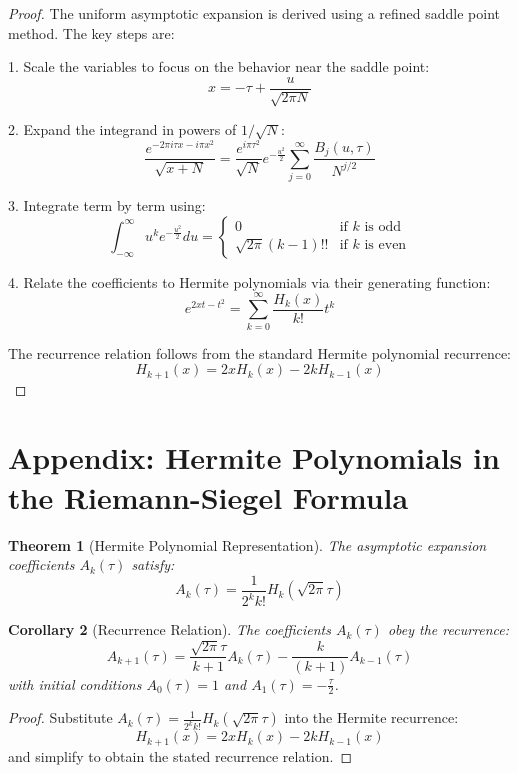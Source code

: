 \documentclass{article}
\newtheorem{theorem}{Theorem}
\newtheorem{corollary}[theorem]{Corollary}
\begin{document}
\begin{proof}
The uniform asymptotic expansion is derived using a refined saddle point method. The key steps are:

1. Scale the variables to focus on the behavior near the saddle point:
\[
x = -\tau + \frac{u}{\sqrt{2\pi N}}
\]

2. Expand the integrand in powers of $1/\sqrt{N}$:
\[
\frac{e^{-2\pi i\tau x - i\pi x^2}}{\sqrt{x+N}} = \frac{e^{i\pi\tau^2}}{\sqrt{N}} e^{-\frac{u^2}{2}} \sum_{j=0}^{\infty} \frac{B_j(u,\tau)}{N^{j/2}}
\]

3. Integrate term by term using:
\[
\int_{-\infty}^{\infty} u^k e^{-\frac{u^2}{2}} du = 
\begin{cases}
0 & \text{if } k \text{ is odd} \\
\sqrt{2\pi} (k-1)!! & \text{if } k \text{ is even}
\end{cases}
\]

4. Relate the coefficients to Hermite polynomials via their generating function:
\[
e^{2xt-t^2} = \sum_{k=0}^{\infty} \frac{H_k(x)}{k!} t^k
\]

The recurrence relation follows from the standard Hermite polynomial recurrence:
\[
H_{k+1}(x) = 2x H_k(x) - 2k H_{k-1}(x)
\]
\end{proof}

\section*{Appendix: Hermite Polynomials in the Riemann-Siegel Formula}

\begin{theorem}[Hermite Polynomial Representation]
The asymptotic expansion coefficients $A_k(\tau)$ satisfy:
\[
A_k(\tau) = \frac{1}{2^k k!} H_k(\sqrt{2\pi}\tau)
\]
\end{theorem}

\begin{corollary}[Recurrence Relation]
The coefficients $A_k(\tau)$ obey the recurrence:
\[
A_{k+1}(\tau) = \frac{\sqrt{2\pi}\tau}{k+1} A_k(\tau) - \frac{k}{(k+1)} A_{k-1}(\tau)
\]
with initial conditions $A_0(\tau) = 1$ and $A_1(\tau) = -\frac{\tau}{2}$.
\end{corollary}

\begin{proof}
Substitute $A_k(\tau) = \frac{1}{2^k k!} H_k(\sqrt{2\pi}\tau)$ into the Hermite recurrence:
\[
H_{k+1}(x) = 2x H_k(x) - 2k H_{k-1}(x)
\]
and simplify to obtain the stated recurrence relation.
\end{proof}
\end{document}
